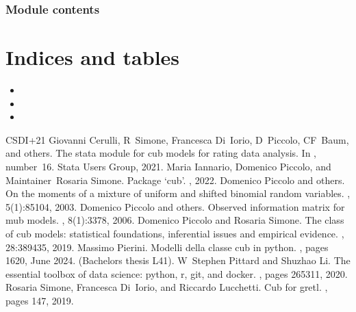 \documentclass[letterpaper,10pt,english]{sphinxmanual}
\begin{document}
\subsection{Module contents}
\label{\detokenize{cubmods:module-cubmods}}\label{\detokenize{cubmods:module-contents}}

\chapter{Indices and tables}
\label{\detokenize{index:indices-and-tables}}\begin{itemize}
\item {} 
\sphinxAtStartPar
{}

\item {} 
\sphinxAtStartPar
{}

\item {} 
\sphinxAtStartPar
{}

\end{itemize}

\begin{sphinxthebibliography}{CSDI+21}
\sphinxAtStartPar
Giovanni Cerulli, R Simone, Francesca Di Iorio, D Piccolo, CF Baum, and others. The stata module for cub models for rating data analysis. In , number 16. Stata Users Group, 2021.
\sphinxAtStartPar
Maria Iannario, Domenico Piccolo, and Maintainer Rosaria Simone. Package ‘cub’. , 2022.
\sphinxAtStartPar
Domenico Piccolo and others. On the moments of a mixture of uniform and shifted binomial random variables. , 5(1):85\textendash{}104, 2003.
\sphinxAtStartPar
Domenico Piccolo and others. Observed information matrix for mub models. , 8(1):33\textendash{}78, 2006.
\sphinxAtStartPar
Domenico Piccolo and Rosaria Simone. The class of cub models: statistical foundations, inferential issues and empirical evidence. , 28:389\textendash{}435, 2019.
\sphinxAtStartPar
Massimo Pierini. Modelli della classe cub in python. , pages 16\textendash{}20, June 2024. (Bachelor\textquotesingle{}s thesis L\sphinxhyphen{}41).
\sphinxAtStartPar
W Stephen Pittard and Shuzhao Li. The essential toolbox of data science: python, r, git, and docker. , pages 265\textendash{}311, 2020.
\sphinxAtStartPar
Rosaria Simone, Francesca Di Iorio, and Riccardo Lucchetti. Cub for gretl. , pages 147, 2019.
\end{sphinxthebibliography}
\end{document}

